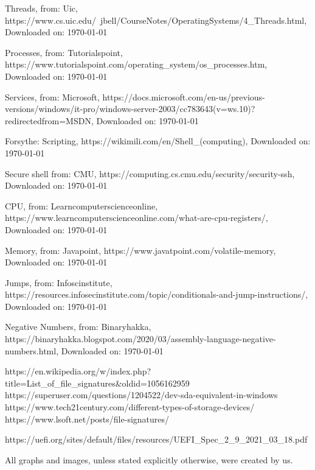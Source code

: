 \begin{thebibliography}{10}
	Threads, from: Uic,
	https://www.cs.uic.edu/~jbell/CourseNotes/OperatingSystems/4_Threads.html,
	Downloaded on: \today

	Processes, from: Tutorialspoint,
	https://www.tutorialspoint.com/operating_system/os_processes.htm,
	Downloaded on: \today

	Services, from: Microsoft,
	https://docs.microsoft.com/en-us/previous-versions/windows/it-pro/windows-server-2003/cc783643(v=ws.10)?redirectedfrom=MSDN,
	Downloaded on: \today

	Forsythe: Scripting,
	https://wikimili.com/en/Shell_(computing),
	Downloaded on: \today

	Secure shell from: CMU,
	https://computing.cs.cmu.edu/security/security-ssh,
	Downloaded on: \today

	CPU, from: Learncomputerscienceonline,
	https://www.learncomputerscienceonline.com/what-are-cpu-registers/,
	Downloaded on: \today

	Memory, from: Javapoint,
	https://www.javatpoint.com/volatile-memory,
	Downloaded on: \today

	Jumps, from: Infoscinstitute,
	https://resources.infosecinstitute.com/topic/conditionals-and-jump-instructions/,
	Downloaded on: \today

	Negative Numbers, from: Binaryhakka,
	https://binaryhakka.blogspot.com/2020/03/assembly-language-negative-numbers.html,
	Downloaded on: \today

\end{thebibliography}


https://en.wikipedia.org/w/index.php?title=List\_of\_file\_signatures&oldid=1056162959
https://superuser.com/questions/1204522/dev-sda-equivalent-in-windows
https://www.tech21century.com/different-types-of-storage-devices/
https://www.lsoft.net/posts/file-signatures/

https://uefi.org/sites/default/files/resources/UEFI\_Spec\_2\_9\_2021\_03\_18.pdf

%
All graphs and images, unless stated explicitly otherwise, were created by us. 
